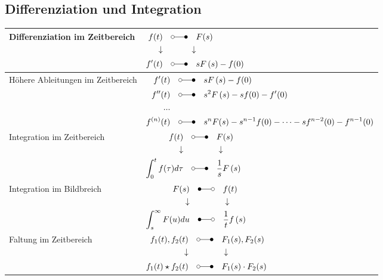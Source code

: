 \documentclass[12pt]{article}
\begin{document}
\subsection{Differenziation und Integration}
\begin{table}[H]
	\centering
	\begin{tabular}{|p{}|l|}
		\hline
		Differenziation im Zeitbereich & $\begin{aligned}
			f(t) &&\laplace\quad& F(s)\\
			\downarrow & & \downarrow\\
			f'(t) &&\laplace\quad& s F\left(s\right) -f(0)
		\end{aligned}$\\\hline
		Höhere Ableitungen im Zeitbereich & $\begin{aligned}
			f'(t) &&\laplace\quad& s F\left(s\right) -f(0)\\
			f''(t) &&\laplace\quad& s^2 F\left(s\right) -sf(0)-f'(0)\\
			... && & \\
			f^{(n)}(t) &&\laplace\quad& s^nF(s)-s^{n-1}f(0)- \dotsm -sf^{n-2}(0) - f^{n-1}(0)
		\end{aligned}$\\\hline
		Integration im Zeitbereich & $\begin{aligned}
			f(t) && \laplace\quad& F(s)\\
			\downarrow && & \downarrow \\
			\int_0^tf(\tau)d\tau && \laplace\quad& \frac{1}{s} F\left(s\right)
		\end{aligned}$\\\hline
		Integration im Bildbreich & $\begin{aligned}
			F(s) && \Laplace\quad& f(t)\\
			\downarrow && & \downarrow \\
			\int_s^\infty F(u)du && \Laplace\quad& \frac{1}{t} f\left(s\right)
		\end{aligned}$\\\hline
		Faltung im Zeitbereich & $\begin{aligned}
			f_1(t),f_2(t) && \laplace\quad& F_1(s),F_2(s)\\
			\downarrow & && \downarrow \\
			f_1(t)\star f_2(t) && \laplace\quad& F_1(s)\cdot F_2(s)
		\end{aligned}$\\\hline
	\end{tabular}
\end{table}
\end{document}
